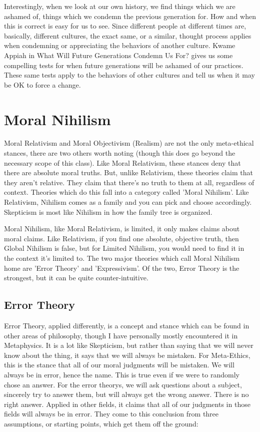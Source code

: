 Interestingly, when we look at our own history, we find things which we are ashamed of, things which we condemn the previous generation for. How and when this is correct is easy for us to see. Since different people at different times are, basically, different cultures, the exact same, or a similar, thought process applies when condemning or appreciating the behaviors of another culture. Kwame Appiah in What Will Future Generations Condemn Us For?\autocite{Appiah1} gives us some compelling tests for when future generations will be ashamed of our practices. These same tests apply to the behaviors of other cultures and tell us when it may be OK to force a change. 

\section{Moral Nihilism}

Moral Relativism and Moral Objectivism (Realism) are not the only meta-ethical stances, there are two others worth noting (though this does go beyond the necessary scope of this class). Like Moral Relativism, these stances deny that there are absolute moral truths. But, unlike Relativism, these theories claim that they aren't relative. They claim that there's no truth to them at all, regardless of context. Theories which do this fall into a category called 'Moral Nihilism'. Like Relativism, Nihilism comes as a family and you can pick and choose accordingly. Skepticism is most like Nihilism in how the family tree is organized. 

Moral Nihilism, like Moral Relativism, is limited, it only makes claims about moral claims. Like Relativism, if you find one absolute, objective truth, then Global Nihilism is false, but for Limited Nihilism, you would need to find it in the context it's limited to. The two major theories which call Moral Nihilism home are 'Error Theory' and 'Expressivism'. Of the two, Error Theory is the strongest, but it can be quite counter-intuitive. 

\subsection{Error Theory}

Error Theory, applied differently, is a concept and stance which can be found in other areas of philosophy, though I have personally mostly encountered it in Metaphysics. It is a lot like Skepticism, but rather than saying that we will never know about the thing, it says that we will always be mistaken.  For Meta-Ethics, this is the stance that all of our moral judgments will be mistaken. We will always be in error, hence the name. This is true even if we were to randomly chose an answer. For the \glspl{error theory}, we will ask questions about a subject, sincerely try to answer them, but will always get the wrong answer. There is no right answer.  Applied in other fields, it claims that all of our judgments in those fields will always be in error. They come to this conclusion from three assumptions, or starting points, which get them off the ground:


